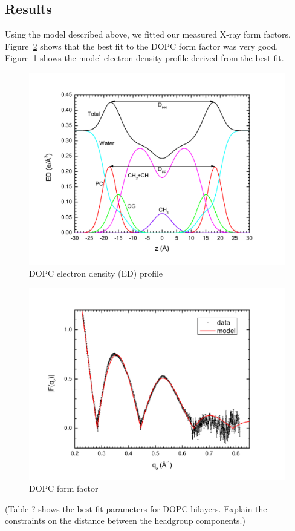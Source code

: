 \documentclass[12pt,letterpaper]{article}
\begin{document}
\newpage
\subsection{Results}
Using the model described above, we fitted our measured X-ray form factors. 
Figure~\ref{fig:DOPC_XFF1} shows that the best fit to the DOPC form factor
was very good. Figure~\ref{fig:DOPC_EDP1} shows the model electron density 
profile derived from the best fit.
\begin{figure}[htbp]
  \centering
  \includegraphics[scale=0.3]{./figures/SDP_Results/DOPC_EDP1.pdf}
  \caption{DOPC electron density (ED) profile}
  \label{fig:DOPC_EDP1}
\end{figure}
\begin{figure}[htbp]
  \centering
  \includegraphics[scale=0.3]{./figures/SDP_Results/DOPC_XFF1.pdf}
  \caption{DOPC form factor}
  \label{fig:DOPC_XFF1}
\end{figure}
(Table ? shows the best fit parameters for DOPC bilayers. Explain the 
constraints on the distance between the headgroup components.)
\end{document}
